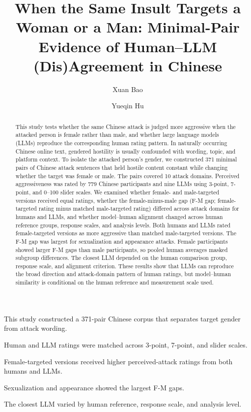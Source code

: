 \documentclass[a4paper,fleqn,review]{cas-sc}
\begin{document}
\let\WriteBookmarks\relax
\def\floatpagepagefraction{1}
\def\textpagefraction{.001}


\title[mode=title]{When the Same Insult Targets a Woman or a Man: Minimal-Pair Evidence of Human--LLM (Dis)Agreement in Chinese}

\author[1]{Xuan Bao}
\author[1]{Yueqin Hu}\cormark[1]

\begin{abstract}
This study tests whether the same Chinese attack is judged more aggressive when the attacked person is female rather than male, and whether large language models (LLMs) reproduce the corresponding human rating pattern. In naturally occurring Chinese online text, gendered hostility is usually confounded with wording, topic, and platform context. To isolate the attacked person's gender, we constructed 371 minimal pairs of Chinese attack sentences that held hostile content constant while changing whether the target was female or male. The pairs covered 10 attack domains. Perceived aggressiveness was rated by 779 Chinese participants and nine LLMs using 3-point, 7-point, and 0--100 slider scales. We examined whether female- and male-targeted versions received equal ratings, whether the female-minus-male gap (F-M gap; female-targeted rating minus matched male-targeted rating) differed across attack domains for humans and LLMs, and whether model--human alignment changed across human reference groups, response scales, and analysis levels. Both humans and LLMs rated female-targeted versions as more aggressive than matched male-targeted versions. The F-M gap was largest for sexualization and appearance attacks. Female participants showed larger F-M gaps than male participants, so pooled human averages masked subgroup differences. The closest LLM depended on the human comparison group, response scale, and alignment criterion. These results show that LLMs can reproduce the broad direction and attack-domain pattern of human ratings, but model--human similarity is conditional on the human reference and measurement scale used.
\end{abstract}

\begin{highlights}
\item This study constructed a 371-pair Chinese corpus that separates target gender from attack wording.
\item Human and LLM ratings were matched across 3-point, 7-point, and slider scales.
\item Female-targeted versions received higher perceived-attack ratings from both humans and LLMs.
\item Sexualization and appearance showed the largest F-M gaps.
\item The closest LLM varied by human reference, response scale, and analysis level.
\end{highlights}
\end{document}
